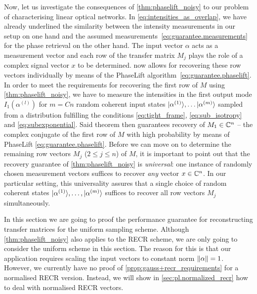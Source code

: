 Now, let us investigate the consequences of \cref{thm:phaselift_noisy} to our problem of characterising linear optical networks.
In \cref{eq:intensities_as_overlap}, we have already underlined the similarity between the intensity measurements in our setup on one hand and the assumed measurements~\eqref{eq:guarantee.measurements} for the phase retrieval on the other hand.
The input vector ${\alpha}$ acts as a measurement vector and each row of the transfer matrix ${M}_j$ plays the role of a complex signal vector $ x$ to be determined.
 now allows for recovering these row vectors individually by means of the PhaseLift algorithm~\eqref{eq:guarantee.phaselift}.
In order to meet the requirements for recovering the first row of ${M}$ using \cref{thm:phaselift_noisy}, we have to measure the intensities in the first output mode $I_1(\alpha^{(l)})$ for $m = Cn$ random coherent input states $\ket{{\alpha}^{(1)}}, \ldots \ket{{\alpha}^{(m)}}$ sampled from a distribution fulfilling the conditions \eqref{eq:tight_frame}, \eqref{eq:sub_isotropy} and \eqref{eq:subexponential}.
Said theorem then guarantees recovery of ${M}_1 \in {\mathbb{C}}^n$ -- the complex conjugate of the first row of $ M$ with high probability by means of PhaseLift \eqref{eq:guarantee.phaselift}.
Before we can move on to determine the remaining row vectors ${M}_{j}$ ($2 \leq j \leq n$) of ${M}$, it is important to point out that the recovery guarantee of \cref{thm:phaselift_noisy} is \emph{universal}: one instance of randomly chosen measurement vectors suffices to recover \emph{any} vector ${x} \in {\mathbb{C}}^n$.
In our particular setting, this universality assures that a single choice of random coherent states $\ket{{\alpha}^{(1)}},\ldots,\ket{{\alpha}^{(m)}}$ suffices to recover all row vectors ${M}_j$ simultaneously.

In this section we are going to proof the performance guarantee for reconstructing transfer matrices for the uniform sampling scheme.
Although \cref{thm:phaselift_noisy} also applies to the RECR scheme, we are only going to consider the uniform scheme in this section.
The reason for this is that our application requires scaling the input vectors to constant norm ${\Vert\alpha\Vert} = 1$.
However, we currently have no proof of \cref{prop:gauss+recr_requirements} for a normalised RECR version.
Instead, we will show in \cref{sec:pl.normalized_recr} how to deal with normalised RECR vectors.

